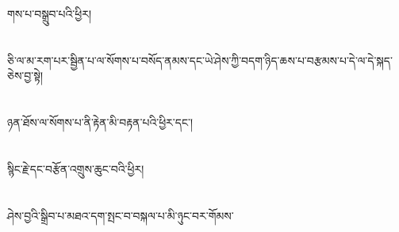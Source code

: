 གས་པ་བསྒྲུབ་པའི་ཕྱིར།\chapter{ }ཅི་ལ་མ་རག་པར་སྦྱིན་པ་ལ་སོགས་པ་བསོད་ནམས་དང་ཡེ་ཤེས་ཀྱི་བདག་ཉིད་ཆས་པ་བརྩམས་པ་དེ་ལ་དེ་སྐད་ཅེས་བྱ་སྟེ།\chapter{ }ཉན་ཐོས་ལ་སོགས་པ་ནི་རྟེན་མི་བརྟན་པའི་ཕྱིར་དང་།\chapter{ }སྙིང་རྗེ་དང་བརྩོན་འགྲུས་ཆུང་བའི་ཕྱིར།\chapter{ }ཤེས་བྱའི་སྒྲིབ་པ་མཐའ་དག་སྤང་བ་བསྐལ་པ་མི་ཉུང་བར་གོམས་